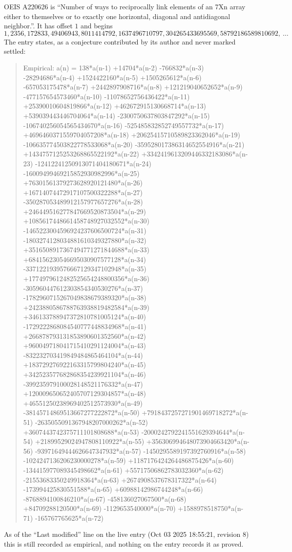\documentclass[11pt,a4paper]{article}
\theoremstyle{plain}
\theoremstyle{definition}
\begin{document}
OEIS A220626 is ``Number of ways to reciprocally link elements of an 7Xn array either to themselves or to exactly one horizontal, diagonal and antidiagonal neighbor.''. It has offset $1$ and begins
\[
1, 2356, 172833, 49406943, 8011414792, 1637496710797, 304265433695569, 58792186589810692,\ \dots
\]
The entry states, as a conjecture contributed by its author and never marked settled:
\begin{quote}
Empirical: a(n) = 138*a(n-1) +14704*a(n-2) -766832*a(n-3) -28294686*a(n-4) +1524422160*a(n-5) +1505265612*a(n-6) -657053175478*a(n-7) +2442897908716*a(n-8) +121219040652652*a(n-9) -477157654573460*a(n-10) -11078652756436422*a(n-11) +25390010604819866*a(n-12) +462672915130668714*a(n-13) +539039443446704064*a(n-14) -2300750637803847292*a(n-15) -106740256054565434670*a(n-16) -525485832852749557732*a(n-17) +4696460371559704057208*a(n-18) +20625415710589823362046*a(n-19) -106635774503822778533068*a(n-20) -359528017386314652554916*a(n-21) +1434757125253268865522192*a(n-22) +3342419613209446332183086*a(n-23) -12412241250913071404180671*a(n-24) -16009499469215852930982996*a(n-25) +76301561379273628920121480*a(n-26) +16714074472917107500322288*a(n-27) -350287053489912157977657276*a(n-28) +246449516277847669520873504*a(n-29) +1085617448661458748927032552*a(n-30) -1465223004596924237606500724*a(n-31) -1803274128034881610349327880*a(n-32) +3516508917367494771271844688*a(n-33) +684156230546695030907577128*a(n-34) -3371221939576667129347102948*a(n-35) +1774979612482525654248800356*a(n-36) -305960447612303854340530276*a(n-37) -1782960715267049838679389320*a(n-38) +2423880586788763938819482584*a(n-39) +346133788947372810781005124*a(n-40) -1729222868084540777448834968*a(n-41) +266878793131853890601352560*a(n-42) +960049718041715410291124004*a(n-43) -832232703419849484865464104*a(n-44) +183729276922163315799804240*a(n-45) +342523577682868354239921104*a(n-46) -399235979100028148521176332*a(n-47) +120009650652405707129304857*a(n-48) +46551250238969402512573930*a(n-49) -38145714869513667277222872*a(n-50) +7918437257271901469718272*a(n-51) -2635055091367948207000262*a(n-52) +3607443742375711101808688*a(n-53) -2000242792241551629394644*a(n-54) +21899529024947808110922*a(n-55) +356306994648073904663420*a(n-56) -93971649444626647347932*a(n-57) -1450295589197392760916*a(n-58) -1024247136206230000278*a(n-59) +1187176424264486875426*a(n-60) -134415977089345498662*a(n-61) +55717506862783032360*a(n-62) -21553683350249918364*a(n-63) +2674908537678317322*a(n-64) -173994425830551588*a(n-65) +60988142986744248*a(n-66) -8768894100846210*a(n-67) -458136027067500*a(n-68) +84709288120500*a(n-69) -1129653540000*a(n-70) +1588978518750*a(n-71) -165767765625*a(n-72)
\end{quote}
As of the ``Last modified'' line on the live entry (Oct 03 2025 18:55:21, revision 8) this is still
recorded as empirical, and nothing on the entry records it as proved.
\end{document}
